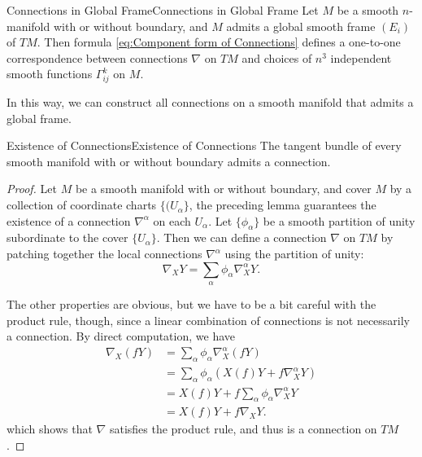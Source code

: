 \documentclass[../main.tex]{subfiles}
\begin{document}
\begin{lemma}{Connections in Global Frame}{Connections in Global Frame}
	Let $M$ be a smooth $n$-manifold with or without boundary, and $M$ admits a global smooth frame $(E_i)$ of $TM$. Then formula \eqref{eq:Component form of Connections} defines a one-to-one correspondence between connections $\nabla$ on $TM$ and choices of $n^3$ independent smooth functions $\Gamma_{ij}^k$ on $M$.
\end{lemma}
\begin{remark}
	In this way, we can construct all connections on a smooth manifold that admits a global frame.
\end{remark}

\begin{proposition}{Existence of Connections}{Existence of Connections}
	The tangent bundle of every smooth manifold with or without boundary admits a connection.
\end{proposition}
\begin{proof}
	Let $M$ be a smooth manifold with or without boundary, and cover $M$ by a collection of coordinate charts $\{(U_{\alpha}\}$, the preceding lemma guarantees the existence of a connection $\nabla^{\alpha}$ on each $U_{\alpha}$. Let $\{\phi_{\alpha}\}$ be a smooth partition of unity subordinate to the cover $\{U_{\alpha}\}$. Then we can define a connection $\nabla$ on $TM$ by patching together the local connections $\nabla^{\alpha}$ using the partition of unity:
	\begin{equation}
		\nabla_X Y = \sum_{\alpha} \phi_{\alpha} \nabla^{\alpha}_X Y.
	\end{equation}

	The other properties are obvious, but we have to be a bit careful with the product rule, though, since a linear combination of connections is not necessarily a connection. By direct computation, we have
	\begin{equation*}
		\begin{aligned}
			\nabla_X (f Y) & = \sum_{\alpha} \phi_{\alpha} \nabla^{\alpha}_X (f Y)          \\
			               & = \sum_{\alpha} \phi_{\alpha} (X(f) Y + f \nabla^{\alpha}_X Y) \\
			               & = X(f) Y + f \sum_{\alpha} \phi_{\alpha} \nabla^{\alpha}_X Y   \\
			               & = X(f) Y + f \nabla_X Y.
		\end{aligned}
	\end{equation*}
	which shows that $\nabla$ satisfies the product rule, and thus is a connection on $TM$.
\end{proof}
\end{document}
